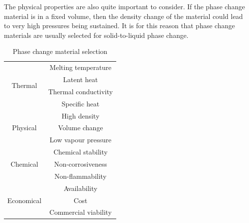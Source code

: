 The physical properties are also quite important to consider. If the phase change material is in a fixed volume, then the density change of the material could lead to very high pressures being sustained. It is for this reason that phase change materials are usually selected for solid-to-liquid phase change.
\begin{table}[ht]
    \centering
    \caption{Phase change material selection \cite{Gadhave_Prabhune_Pathan_2020}}
    \begin{tabular}{ c | c } 
        \hline
        \multirow{4}{*}{Thermal} & Melting temperature \\ & Latent heat \\ & Thermal conductivity \\ & Specific heat \\
        \hline
        \multirow{3}{*}{Physical} & High density \\ & Volume change \\ & Low vapour pressure \\
        \hline
        \multirow{3}{*}{Chemical} & Chemical stability \\ & Non-corrosiveness \\ & Non-flammability \\
        \hline
        \multirow{3}{*}{Economical} & Availability \\ & Cost \\ & Commercial viability \\
        \hline
    \end{tabular}
    \label{table:pcm_selection}
\end{table}

